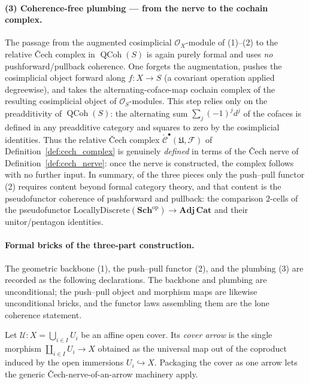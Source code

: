 \paragraph{(3) Coherence-free plumbing — from the nerve to the cochain complex.}
The passage from the augmented cosimplicial \(\mathcal{O}_X\)-module of (1)--(2)
to the relative {\v C}ech complex in \(\operatorname{QCoh}(S)\) is again purely
formal and uses \emph{no} pushforward/pullback coherence. One forgets the
augmentation, pushes the cosimplicial object forward along \(f : X \to S\) (a
covariant operation applied degreewise), and takes the alternating-coface-map
cochain complex of the resulting cosimplicial object of \(\mathcal{O}_S\)-modules.
This step relies only on the preadditivity of \(\operatorname{QCoh}(S)\): the
alternating sum \(\sum_{j} (-1)^j d^j\) of the cofaces is defined in any
preadditive category and squares to zero by the cosimplicial identities. Thus the
relative {\v C}ech complex \(\check{\mathcal{C}}^\bullet(\mathfrak{U}, \mathcal{F})\)
of Definition~\ref{def:cech_complex} is genuinely \emph{defined} in terms of the
{\v C}ech nerve of Definition~\ref{def:cech_nerve}: once the nerve is constructed,
the complex follows with no further input. In summary, of the three pieces only
the push--pull functor (2) requires content beyond formal category theory, and
that content is the pseudofunctor coherence of pushforward and pullback: the
comparison \(2\)-cells of the pseudofunctor
\(\mathrm{LocallyDiscrete}(\mathbf{Sch}^{\mathrm{op}}) \to \mathbf{Adj}\,\mathbf{Cat}\)
and their unitor/pentagon identities.

\paragraph{Formal bricks of the three-part construction.}
The geometric backbone (1), the push--pull functor (2), and the plumbing (3) are
recorded as the following declarations. The backbone and plumbing are
unconditional; the push--pull object and morphism maps are likewise unconditional
bricks, and the functor laws assembling them are the lone coherence statement.

\begin{definition}
  \label{def:cover_arrow}
  Let \(\mathcal{U} : X = \bigcup_{i \in I} U_i\) be an affine open cover. Its
  \emph{cover arrow} is the single morphism
  \(\coprod_{i \in I} U_i \longrightarrow X\) obtained as the universal map out of
  the coproduct induced by the open immersions \(U_i \hookrightarrow X\). Packaging
  the cover as one arrow lets the generic {\v C}ech-nerve-of-an-arrow machinery
  apply.
\end{definition}

